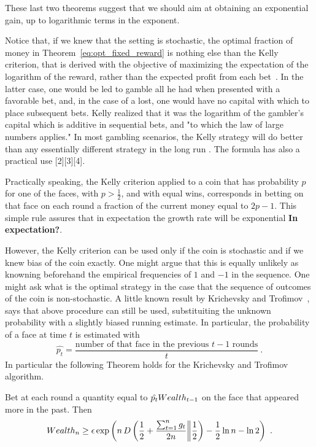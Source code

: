 These last two theorems suggest that we should aim at obtaining an exponential gain, up to logarithmic terms in the exponent.

Notice that, if we knew that the setting is stochastic, the optimal fraction of money in Theorem~\ref{eq:opt_fixed_reward} is nothing else than the Kelly criterion, that is derived with the objective of maximizing the expectation of the logarithm of the reward, rather than the expected profit from each bet~\citep{Kelly56}.
In the latter case, one would be led to gamble all he had when presented with a favorable bet, and, in the case of a lost, one would have no capital with which to place subsequent bets. Kelly realized that it was the logarithm of the gambler's capital which is additive in sequential bets, and "to which the law of large numbers applies."
In most gambling scenarios, the Kelly strategy will do better than any essentially different strategy in the long run \cite{}. The formula has also a practical use [2][3][4].

Practically speaking, the Kelly criterion applied to a coin that has probability $p$ for one of the faces, with $p> \frac{1}{2}$, and with equal wins, corresponds in betting on that face on each round a fraction of the current money equal to $2p-1$. This simple rule assures that in expectation the growth rate will be exponential \textbf{In expectation?}.

However, the Kelly criterion can be used only if the coin is stochastic and if we knew bias of the coin exactly. One might argue that this is equally unlikely as knowning beforehand the empirical frequencies of $1$ and $-1$ in the sequence.
One might ask what is the optimal strategy in the case that the sequence of outcomes of the coin is non-stochastic.
A little known result by Krichevsky and Trofimov~\cite{KrichevskyT81}, says that above procedure can still be used, substituiting the  unknown probability with a slightly biased running estimate. In particular, the probability of a face at time $t$ is estimated with 
\[
\hat{p_t}=\frac{\text{number of that face in the previous } t-1 \text{ rounds}}{t}~.
\]
In particular the following Theorem holds for the Krichevsky and Trofimov algorithm.
\begin{theorem}
Bet at each round a quantity equal to $\hat{p_t} Wealth_{t-1}$ on the face that appeared more in the past. Then
\begin{align*}
Wealth_{n}
\geq \epsilon \exp\left(n\, D\left(\frac{1}{2}+\frac{\sum_{t=1}^n g_t}{2 n}\middle\|\frac{1}{2}\right) - \frac{1}{2} \ln n - \ln 2\right)~.
\end{align*}
\end{theorem}


